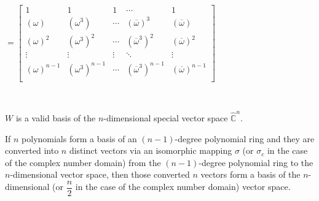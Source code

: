 \text{ } \text{ }  $= \begin{bmatrix}
1 & 1 & 1 & \cdots & 1\\
(\omega) & (\omega^3) & \cdots & (\overline{\omega})^3 & (\overline{\omega})\\
(\omega)^2 & (\omega^3)^2 & \cdots & (\overline{\omega}^3)^2 & (\overline{\omega})^2\\
\vdots & \vdots & \vdots & \ddots & \vdots \\
(\omega)^{n-1} & (\omega^3)^{n-1} & \cdots & (\overline{\omega}^3)^{n-1} & (\overline{\omega})^{n-1}\\
\end{bmatrix}$

$ $

$W$ is a valid basis of the $n$-dimensional special vector space $\hat{\mathbb C}^{n}$. 



\begin{tcolorbox}[title={\textbf{\tboxtheorem{\ref*{subsec:poly-vector-transformation-complex}} Transforming Basis between Polynomial Ring and Vector Space}}]

If $n$ polynomials form a basis of an $(n-1)$-degree polynomial ring and they are converted into $n$ distinct vectors via an isomorphic mapping $\sigma$ (or $\sigma_c$ in the case of the complex number domain) from the $(n-1)$-degree polynomial ring to the $n$-dimensional vector space, then those converted $n$ vectors form a basis of the $n$-dimensional (or $\dfrac{n}{2}$ in the case of the complex number domain) vector space. 

\end{tcolorbox}